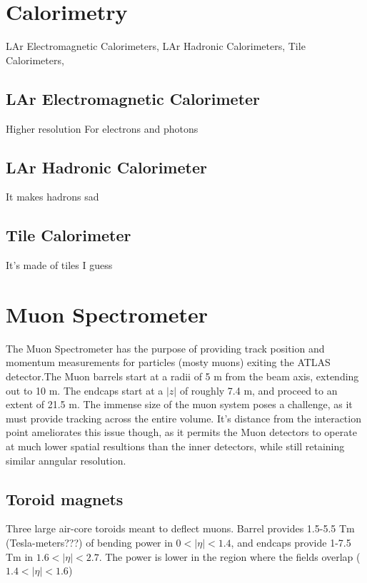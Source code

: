 

\section{Calorimetry} %
    LAr Electromagnetic Calorimeters,
    LAr Hadronic Calorimeters,
    Tile Calorimeters,


    \subsection{LAr Electromagnetic Calorimeter}
        Higher resolution
        For electrons and photons


    \subsection{LAr Hadronic Calorimeter}
        It makes hadrons sad


    \subsection{Tile Calorimeter}
        It's made of tiles I guess


\section{Muon Spectrometer}  %
    The Muon Spectrometer has the purpose of providing track position and momentum measurements for particles (mosty muons) exiting the ATLAS detector.The Muon barrels start at a radii of 5 m from the beam axis, extending out to 10 m. The endcaps start at a $|z|$ of roughly 7.4 m, and proceed to an extent of 21.5 m. The immense size of the muon system poses a challenge, as it must provide tracking across the entire volume. It's distance from the interaction point ameliorates this issue though, as it permits the Muon detectors to operate at much lower spatial resultions than the inner detectors, while still retaining similar anngular resolution.

    \subsection{Toroid magnets}
        Three large air-core toroids meant to deflect muons.
        Barrel provides 1.5-5.5 Tm (Tesla-meters???) of bending power in $0<|\eta|<1.4$,
        and endcaps provide 1-7.5 Tm in $1.6<|\eta|<2.7$.
        The power is lower in the region where the fields overlap ($1.4<|\eta|<1.6$)


